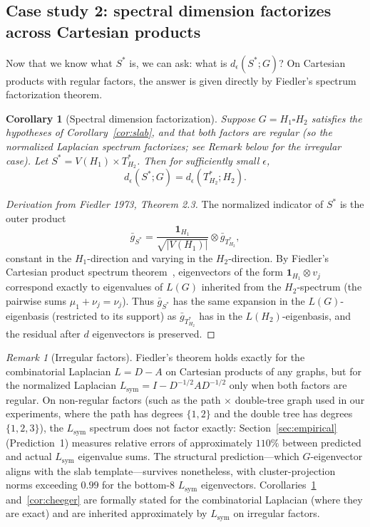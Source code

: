 \documentclass{article}
\newtheorem{corollary}{Corollary}
\theoremstyle{definition}
\theoremstyle{remark}
\newtheorem*{remark}{Remark}
\begin{document}
\subsection{Case study 2: spectral dimension factorizes across Cartesian products}
\label{sec:case2}

Now that we know what $S^*$ is, we can ask: what is $d_\epsilon(S^*; G)$? On Cartesian products with regular factors, the answer is given directly by Fiedler's spectrum factorization theorem.

\begin{corollary}[Spectral dimension factorization]
\label{cor:spectral-dim}
Suppose $G = H_1 \square H_2$ satisfies the hypotheses of Corollary~\ref{cor:slab}, and that both factors are regular (so the normalized Laplacian spectrum factorizes; see Remark below for the irregular case). Let $S^* = V(H_1) \times T^*_{H_2}$. Then for sufficiently small $\epsilon$,
\[
d_\epsilon(S^*; G) = d_\epsilon(T^*_{H_2}; H_2).
\]
\end{corollary}

\begin{proof}[Derivation from Fiedler 1973, Theorem 2.3]
The normalized indicator of $S^*$ is the outer product
\[
\bar g_{S^*} = \frac{\mathbf{1}_{H_1}}{\sqrt{|V(H_1)|}} \otimes \bar g_{T^*_{H_2}},
\]
constant in the $H_1$-direction and varying in the $H_2$-direction. By Fiedler's Cartesian product spectrum theorem~\cite{fiedler1973algebraic}, eigenvectors of the form $\mathbf{1}_{H_1} \otimes v_j$ correspond exactly to eigenvalues of $L(G)$ inherited from the $H_2$-spectrum (the pairwise sums $\mu_1 + \nu_j = \nu_j$). Thus $\bar g_{S^*}$ has the same expansion in the $L(G)$-eigenbasis (restricted to its support) as $\bar g_{T^*_{H_2}}$ has in the $L(H_2)$-eigenbasis, and the residual after $d$ eigenvectors is preserved.
\end{proof}

\begin{remark}[Irregular factors]
\label{rem:lsym}
Fiedler's theorem holds exactly for the combinatorial Laplacian $L = D - A$ on Cartesian products of any graphs, but for the normalized Laplacian $L_{\mathrm{sym}} = I - D^{-1/2} A D^{-1/2}$ only when both factors are regular. On non-regular factors (such as the path $\times$ double-tree graph used in our experiments, where the path has degrees $\{1,2\}$ and the double tree has degrees $\{1,2,3\}$), the $L_{\mathrm{sym}}$ spectrum does not factor exactly: Section~\ref{sec:empirical} (Prediction~1) measures relative errors of approximately $110\%$ between predicted and actual $L_{\mathrm{sym}}$ eigenvalue sums. The structural prediction---which $G$-eigenvector aligns with the slab template---survives nonetheless, with cluster-projection norms exceeding $0.99$ for the bottom-8 $L_{\mathrm{sym}}$ eigenvectors. Corollaries~\ref{cor:spectral-dim} and~\ref{cor:cheeger} are formally stated for the combinatorial Laplacian (where they are exact) and are inherited approximately by $L_{\mathrm{sym}}$ on irregular factors.
\end{remark}
\end{document}
